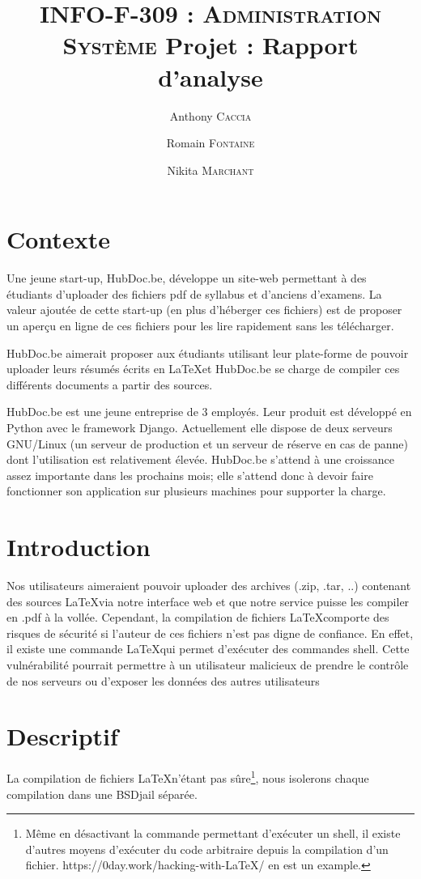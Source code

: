 \documentclass[10pt,a4paper]{article}
\author{Anthony \textsc{Caccia} \and Romain \textsc{Fontaine} \and Nikita \textsc{Marchant} }
\date{}
\title{\textsc{INFO-F-309 : Administration Système} Projet : Rapport d'analyse}
\begin{document}
\maketitle

\section{Contexte}

Une jeune start-up, HubDoc.be, développe un site-web permettant à des étudiants d'uploader des fichiers pdf de syllabus et d'anciens d'examens.
La valeur ajoutée de cette start-up (en plus d'héberger ces fichiers) est de proposer un aperçu en ligne de ces fichiers pour les lire rapidement sans les télécharger.

HubDoc.be aimerait proposer aux étudiants utilisant leur plate-forme de pouvoir uploader leurs résumés écrits en \LaTeX et HubDoc.be se charge de compiler ces différents documents a partir des sources.

HubDoc.be est une jeune entreprise de 3 employés.
Leur produit est développé en Python avec le framework Django.
Actuellement elle dispose de deux serveurs GNU/Linux (un serveur de production et un serveur de réserve en cas de panne) dont l'utilisation est relativement élevée.
HubDoc.be s'attend à une croissance assez importante dans les prochains mois;
elle s'attend donc à devoir faire fonctionner son application sur plusieurs machines pour supporter la charge.


\section{Introduction}

Nos utilisateurs aimeraient pouvoir uploader des archives (.zip, .tar, ..) contenant des sources \LaTeX via notre interface web et que notre service puisse les compiler en .pdf à la vollée.
Cependant, la compilation de fichiers \LaTeX comporte des risques de sécurité si l'auteur de ces fichiers n'est pas digne de confiance.
En effet, il existe une commande \LaTeX qui permet d'exécuter des commandes shell.
Cette vulnérabilité pourrait permettre à un utilisateur malicieux de prendre le contrôle de nos serveurs ou d'exposer les données des autres utilisateurs

\section{Descriptif}

La compilation de fichiers \LaTeX n'étant pas sûre\footnote{Même en désactivant la commande permettant d'exécuter un shell, il existe d'autres moyens d'exécuter du code arbitraire depuis la compilation d'un fichier. https://0day.work/hacking-with-LaTeX/ en est un example.}, nous isolerons chaque compilation dans une BSDjail séparée.
\end{document}
